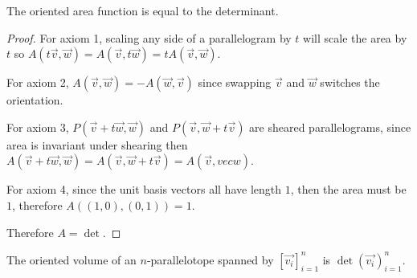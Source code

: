 \documentclass[notes.tex]{subfiles}
\begin{document}
\begin{lemma}
    The oriented area function is equal to the determinant.
\end{lemma}
\begin{proof}
    For axiom 1, scaling any side of a parallelogram by $t$ will scale the area by $t$ so $A(t\vec{v}, \vec{w}) = A(\vec{v}, t\vec{w}) = tA(\vec{v}, \vec{w})$.

    For axiom 2, $A(\vec{v}, \vec{w}) = -A(\vec{w}, \vec{v})$ since swapping $\vec{v}$ and $\vec{w}$ switches the orientation.

    For axiom 3, $P(\vec{v} + t\vec{w}, \vec{w})$ and $P(\vec{v}, \vec{w} + t\vec{v})$ are sheared parallelograms, since area is invariant under shearing then $A(\vec{v} + t\vec{w}, \vec{w}) = A(\vec{v}, \vec{w} + t\vec{v}) = A(\vec{v},vec{w})$.

    For axiom 4, since the unit basis vectors all have length $1$, then the area must be $1$, therefore $A((1, 0), (0, 1)) = 1$.

    Therefore $A = \det$.
\end{proof}

\begin{theorem}
    The oriented volume of an $n$-parallelotope spanned by $[\vec{v_i}]_{i = 1}^n$ is $\det(\vec{v_i})_{i = 1}^n$.
\end{theorem}
\end{document}
